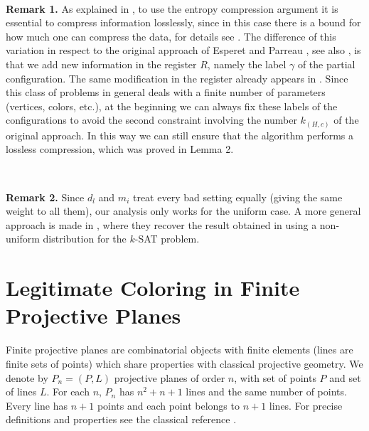 \documentclass[11pt]{amsart}
\numberwithin{equation}{section}
\begin{document}
 \

\textbf{Remark 1.} As explained in \cite{Tao}, to use the entropy compression argument it is essential to compress information losslessly, since in this case there is a bound for how much one can compress the data, for details see \cite{Ash, Shannon}. The difference of this variation in respect to the original approach of Esperet and Parreau \cite{Entropy Compression}, see also \cite{Aldo}, is that we add new information in the register $R$, namely the label $\gamma$ of the partial configuration. The same modification in the register already appears in \cite{Entropy3}.  Since this class of problems in general deals with a finite number of parameters (vertices, colors, etc.), at the beginning we can always fix these labels of the configurations to avoid the second constraint involving the number $k_{(H,c)}$ of the original approach. In this way we can still ensure that the algorithm performs a lossless compression, which was proved in Lemma 2. 

\

\textbf{Remark 2.} Since $d_{l}$ and $m_i$ treat every bad setting equally (giving the same weight to all them), our analysis only works for the uniform case. A more general approach is made in \cite{AIS}, where they recover the result obtained in \cite{GST} using a non-uniform distribution for the $k$-SAT problem.


\section{Legitimate Coloring in Finite Projective Planes}

 Finite projective planes are combinatorial objects with finite elements (lines are finite sets of points) which share properties with classical projective geometry. We denote by $P_n = (P,L)$ projective planes of order $n$, with set of points $P$ and set of lines $L$. For each $n$, $P_n$ has $n^2+n+1$ lines and the same number of points. Every line has $n+1$ points and each point belongs to $n+1$ lines. For precise definitions and properties see the classical reference \cite{Hall}. 
\end{document}
